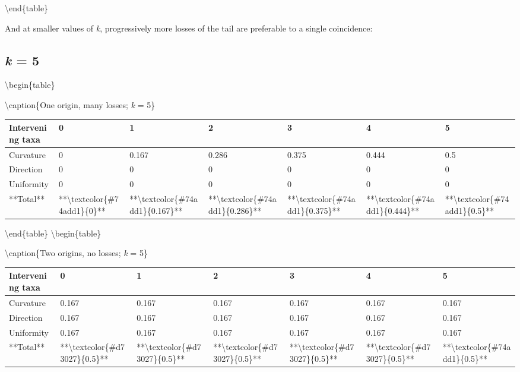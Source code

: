 \documentclass[]{book}
\theoremstyle{definition}
\theoremstyle{definition}
\theoremstyle{definition}
\theoremstyle{remark}
\begin{document}
\textbackslash{}end\{table\}

And at smaller values of \emph{k}, progressively more losses of the tail
are preferable to a single coincidence:

\hypertarget{k-5}{%
\subsection{\texorpdfstring{\emph{k} = 5}{k = 5}}\label{k-5}}

\textbackslash{}begin\{table\}

\textbackslash{}caption\{\label{tab:unnamed-chunk-75}One origin, many
losses; \emph{k} = 5\} \centering

\begin{tabular}[t]{l|l|l|l|l|l|l}
\hline
Intervening taxa & 0 & 1 & 2 & 3 & 4 & 5\\
\hline
Curvature & 0 & 0.167 & 0.286 & 0.375 & 0.444 & 0.5\\
\hline
Direction & 0 & 0 & 0 & 0 & 0 & 0\\
\hline
Uniformity & 0 & 0 & 0 & 0 & 0 & 0\\
\hline
**Total** & **\textbackslash{}textcolor\{\#74add1\}\{0\}** & **\textbackslash{}textcolor\{\#74add1\}\{0.167\}** & **\textbackslash{}textcolor\{\#74add1\}\{0.286\}** & **\textbackslash{}textcolor\{\#74add1\}\{0.375\}** & **\textbackslash{}textcolor\{\#74add1\}\{0.444\}** & **\textbackslash{}textcolor\{\#74add1\}\{0.5\}**\\
\hline
\end{tabular}

\textbackslash{}end\{table\} \textbackslash{}begin\{table\}

\textbackslash{}caption\{\label{tab:unnamed-chunk-76}Two origins, no losses;
\emph{k} = 5\} \centering

\begin{tabular}[t]{l|l|l|l|l|l|l}
\hline
Intervening taxa & 0 & 1 & 2 & 3 & 4 & 5\\
\hline
Curvature & 0.167 & 0.167 & 0.167 & 0.167 & 0.167 & 0.167\\
\hline
Direction & 0.167 & 0.167 & 0.167 & 0.167 & 0.167 & 0.167\\
\hline
Uniformity & 0.167 & 0.167 & 0.167 & 0.167 & 0.167 & 0.167\\
\hline
**Total** & **\textbackslash{}textcolor\{\#d73027\}\{0.5\}** & **\textbackslash{}textcolor\{\#d73027\}\{0.5\}** & **\textbackslash{}textcolor\{\#d73027\}\{0.5\}** & **\textbackslash{}textcolor\{\#d73027\}\{0.5\}** & **\textbackslash{}textcolor\{\#d73027\}\{0.5\}** & **\textbackslash{}textcolor\{\#74add1\}\{0.5\}**\\
\hline
\end{tabular}
\end{document}
